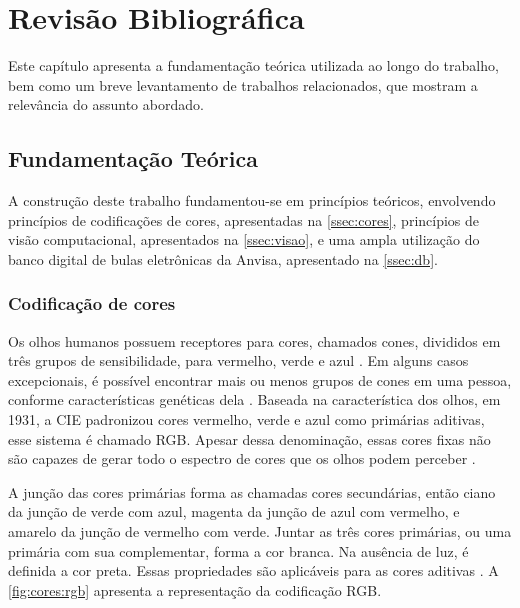 \chapter{Revisão Bibliográfica}\label{cap:revbib}


Este capítulo apresenta a fundamentação teórica utilizada ao longo do trabalho, bem como um breve levantamento de trabalhos relacionados, que mostram a relevância do assunto abordado.

\section{Fundamentação Teórica}


A construção deste trabalho fundamentou-se em princípios teóricos, envolvendo princípios de codificações de cores, apresentadas na \autoref{ssec:cores}, princípios de visão computacional, apresentados na \autoref{ssec:visao}, e uma ampla utilização do banco digital de bulas eletrônicas da \ac{Anvisa}, apresentado na \autoref{ssec:db}.

\subsection{Codificação de cores}\label{ssec:cores}

Os olhos humanos possuem receptores para cores, chamados cones, divididos em três grupos de sensibilidade, para vermelho, verde e azul \cite{gonzalez2008digital}.
Em alguns casos excepcionais, é possível encontrar mais ou menos grupos de cones em uma pessoa, conforme características genéticas dela \cite{connell2019ColorBlindness, timjewell2023Tetrachromacy}.
Baseada na característica dos olhos, em 1931, a \ac{CIE} padronizou cores vermelho, verde e azul como primárias aditivas, esse sistema é chamado \ac{RGB}.
Apesar dessa denominação, essas cores fixas não são capazes de gerar todo o espectro de cores que os olhos podem perceber \cite{gonzalez2008digital}.

A junção das cores primárias forma as chamadas cores secundárias, então ciano da junção de verde com azul, magenta da junção de azul com vermelho, e amarelo da junção de vermelho com verde.
Juntar as três cores primárias, ou uma primária com sua complementar, forma a cor branca.
Na ausência de luz, é definida a cor preta.
Essas propriedades são aplicáveis para as cores aditivas \cite{gonzalez2008digital}.
A \autoref{fig:cores:rgb} apresenta a representação da codificação RGB.

